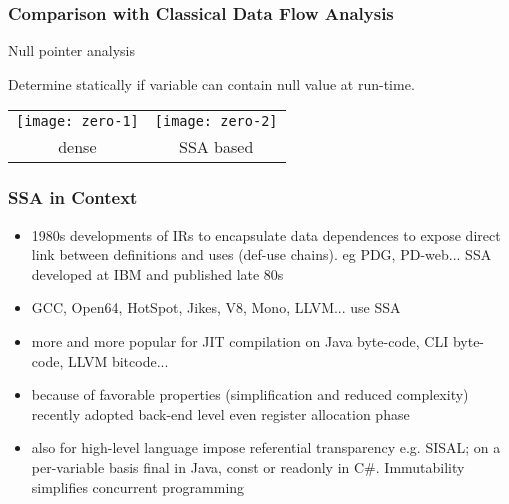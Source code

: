 \begin{frame}
\frametitle{Comparison with Classical Data Flow Analysis}
\begin{block}{Null pointer analysis}
  \begin{overprint}
    \onslide<+>
    Determine statically if variable can contain null value at run-time.
    \onslide<+->
    \begin{center}
      \footnotesize
      \begin{tabular}[t]{c@{\hskip1cm}c}
      \texttt{[image: zero-1]} &
      \texttt{[image: zero-2]}\\[1ex]
      dense & SSA based
    \end{tabular}
    \end{center}
  \end{overprint}
\end{block}

\end{frame}

\begin{frame}
\frametitle{SSA in Context}
\begin{itemize} 
\item 1980s developments of IRs to encapsulate data dependences to expose direct link between definitions and uses (def-use chains). eg PDG, PD-web... SSA developed at IBM and published late 80s
\item GCC, Open64, HotSpot, Jikes, V8, Mono, LLVM... use SSA
\item more and more popular for JIT compilation on Java byte-code, CLI byte-code, LLVM bitcode...
\item because of favorable properties (simplification and reduced complexity) recently adopted back-end level even register allocation phase
\item also for high-level language impose referential transparency e.g. SISAL; on a per-variable basis final in Java, const or readonly in C\#. Immutability simplifies concurrent programming  
\end{itemize}
\end{frame}


